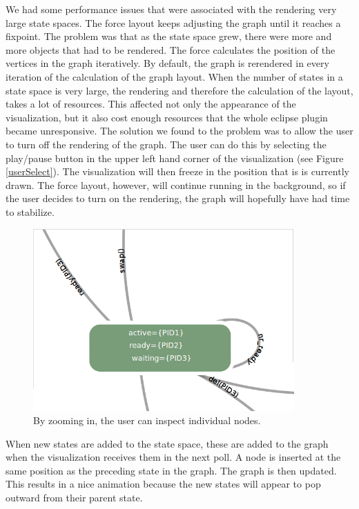 We had some performance issues that were associated with the rendering very large state spaces. The force layout keeps adjusting the graph until it reaches a fixpoint. The problem was that as the state space grew, there were more and more objects that had to be rendered. The force calculates the position of the vertices in the graph iteratively. By default, the graph is rerendered in every iteration of the calculation of the graph layout. When the number of states in a state space is very large, the rendering and therefore the calculation of the layout, takes a lot of resources. This affected not only the appearance of the visualization, but it also cost enough resources that the whole eclipse plugin became unresponsive. The solution we found to the problem was to allow the user to turn off the rendering of the graph. The user can do this by selecting the play/pause button in the upper left hand corner of the visualization (see Figure \ref{userSelect}). The visualization will then freeze in the position that is is currently drawn. The force layout, however, will continue running in the background, so if the user decides to turn on the rendering, the graph will hopefully have had time to stabilize.

\begin{center}
\begin{figure}[h!]
\centering
\includegraphics[width=10cm]{bilder/onestate.png}
\caption{By zooming in, the user can inspect individual nodes.}
\label{onestate}
\end{figure}
\end{center}

When new states are added to the state space, these are added to the graph when the visualization receives them in the next poll. A node is inserted at the same position as the preceding state in the graph. The graph is then updated. This results in a nice animation because the new states will appear to pop outward from their parent state.

